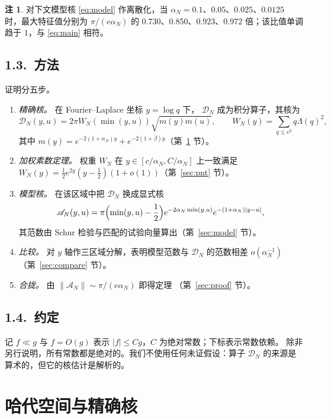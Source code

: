 \documentclass[12pt,a4paper]{amsart}
\numberwithin{equation}{section}
\theoremstyle{plain}
\theoremstyle{definition}
\newtheorem{remark}[theorem]{注}
\begin{document}
\begin{remark}\label{rem:numerical}
对下文模型核 \eqref{eq:model} 作离散化，当
$\alpha_N=0.1$、$0.05$、$0.025$、$0.0125$ 时，最大特征值分别为
$\pi/(e\alpha_N)$ 的 $0.730$、$0.850$、$0.923$、$0.972$ 倍；该比值单调
趋于 $1$，与 \eqref{eq:main} 相符。
\end{remark}

\subsection*{1.3.\ 方法}

证明分五步。

\begin{enumerate}
\item[\rm(A)] \emph{精确核。} 在 Fourier--Laplace 坐标 $y=\log q$ 下，
$\mathcal D_N$ 成为积分算子，其核为
\[
 \mathscr D_N(y,u)=2\pi W_N(\min(y,u))\sqrt{m(y)m(u)},\qquad
 W_N(y)=\sum_{q\le e^y}q\Lambda(q)^2 ,
\]
其中 $m(y)=e^{-2(1+\alpha_N)y}+e^{-2(1+\beta)y}$（第~\ref{sec:kernel} 节）。
\item[\rm(B)] \emph{加权素数定理。} 权重 $W_N$ 在
$y\in[c/\alpha_N,C/\alpha_N]$ 上一致满足
$W_N(y)=\frac12e^{2y}(y-\frac12)(1+o(1))$（第~\ref{sec:pnt} 节）。
\item[\rm(C)] \emph{模型核。} 在该区域中把 $\mathscr D_N$ 换成显式核
\[
 \mathscr A_N(y,u)=\pi\Bigl(\min(y,u)-\frac12\Bigr)
 e^{-2\alpha_N\min(y,u)}e^{-(1+\alpha_N)|y-u|},
\]
其范数由 Schur 检验与匹配的试验向量算出（第~\ref{sec:model} 节）。
\item[\rm(D)] \emph{比较。} 对 $y$ 轴作三区域分解，表明模型范数与
$\mathcal D_N$ 的范数相差 $o(\alpha_N^{-1})$（第~\ref{sec:compare} 节）。
\item[\rm(E)] \emph{合拢。} 由 $\|\mathscr A_N\|\sim\pi/(e\alpha_N)$ 即得定理
（第~\ref{sec:proof} 节）。
\end{enumerate}

\subsection*{1.4.\ 约定}

记 $f\ll g$ 与 $f=O(g)$ 表示 $|f|\le Cg$，$C$ 为绝对常数；下标表示常数依赖。
除非另行说明，所有常数都是绝对的。我们不使用任何未证假设：算子 $\mathcal D_N$
的来源是算术的，但它的核估计是解析的。

\section{哈代空间与精确核}\label{sec:kernel}
\end{document}
